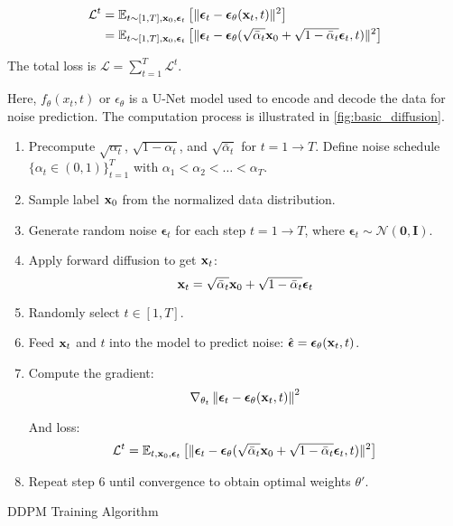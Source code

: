 \begin{equation}
	\label{eq:diffusion_loss}
	\begin{aligned}
		\mathcal{L}^t
		&= \mathbb{E}_{t \sim [1, T], \mathbf{x}_0, \boldsymbol{\epsilon}_t} \left[\|\boldsymbol{\epsilon}_t - \boldsymbol{\epsilon}_\theta(\mathbf{x}_t, t)\|^2 \right] \\
		&= \mathbb{E}_{t \sim [1, T], \mathbf{x}_0, \boldsymbol{\epsilon}_t} \left[\|\boldsymbol{\epsilon}_t - \boldsymbol{\epsilon}_\theta(\sqrt{\bar{\alpha}_t}\mathbf{x}_0 + \sqrt{1 - \bar{\alpha}_t}\boldsymbol{\epsilon}_t, t)\|^2 \right]
	\end{aligned}
\end{equation}

The total loss is $\mathcal{L} = \sum_{t=1}^T \mathcal{L}^t$.

Here, $f_{\theta}(x_t, t)$ or $\epsilon_\theta$ is a U-Net model used to encode and decode the data for noise prediction. The computation process is illustrated in \autoref{fig:basic_diffusion}.

\begin{algorithm}[H]
	\setlength{\baselineskip}{10pt}
	\begin{enumerate}
		\vspace{5pt}
		\item Precompute $\sqrt{\alpha_t}$, $\sqrt{1 - \alpha_t}$, and $\sqrt{\bar{\alpha}_t}$ for $t = 1 \rightarrow T$. Define noise schedule $\{\alpha_t \in (0, 1)\}_{t=1}^T$ with $\alpha_1 < \alpha_2 < \dots < \alpha_T$.
		
		\item Sample label $\mathbf{x}_0$ from the normalized data distribution.
		
		\item Generate random noise $\boldsymbol{\epsilon}_t$ for each step $t = 1 \rightarrow T$, where $\boldsymbol{\epsilon}_t \sim \mathcal{N}(\mathbf{0}, \mathbf{I})$.
		
		\item Apply forward diffusion to get $\mathbf{x}_t$:
		$$
		\mathbf{x}_t = \sqrt{\bar{\alpha}_t} \mathbf{x}_0 + \sqrt{1 - \bar{\alpha}_t} \boldsymbol{\epsilon}_t
		$$
		
		\item Randomly select $t \in [1, T]$.
		
		\item Feed $\mathbf{x}_t$ and $t$ into the model to predict noise: $\hat{\boldsymbol{\epsilon}} = \boldsymbol{\epsilon}_\theta(\mathbf{x}_t, t)$.
		
		\item Compute the gradient:
		$$
		\nabla_{\theta_t} \left\| \boldsymbol{\epsilon}_t - \boldsymbol{\epsilon}_\theta(\mathbf{x}_t, t) \right\|^2
		$$
		
		And loss:
		$$
		\mathcal{L}^t = \mathbb{E}_{t, \mathbf{x}_0, \boldsymbol{\epsilon}_t} \left[ \|\boldsymbol{\epsilon}_t - \boldsymbol{\epsilon}_\theta(\sqrt{\bar{\alpha}_t} \mathbf{x}_0 + \sqrt{1 - \bar{\alpha}_t} \boldsymbol{\epsilon}_t, t)\|^2 \right]
		$$
		
		\item Repeat step 6 until convergence to obtain optimal weights $\theta'$.
	\end{enumerate}
	\caption{DDPM Training Algorithm}
	\label{alg:TrainingDDPM}
\end{algorithm}

